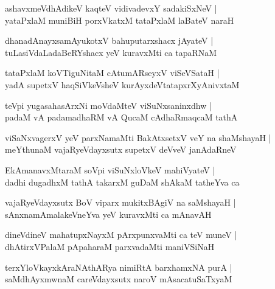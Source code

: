 \documentclass[twoside,12pt,openright]{book}
\newcounter{shloka}[chapter]
\begin{document}
\begin{shloka}%
ashavxmeVdhAdikeV kaqteV vidivadevxY sadakiSxNeV |\\
yataPxlaM muniBiH porxVkatxM tataPxlaM laBateV naraH
\end{shloka}

\begin{shloka}%
dhanadAnayxsamAyukotxV bahuputarxshacx jAyateV |\\
tuLasiVdaLadaBeRYshacx yeV kuravxMti ca tapaRNaM 
\end{shloka}

\begin{shloka}%
tataPxlaM koVTiguNitaM cAtumARseyxV viSeVSataH |\\
yadA supetxV haqSiVkeVsheV kurAyxdeVtatapxrXyAnivxtaM
\end{shloka}

\begin{shloka}%
teVpi yugasahasArxNi moVdaMteV viSuNxsaninxdhw |\\
padaM vA padamadhaRM vA QucaM cAdhaRmaqcaM tathA 
\end{shloka}

\begin{shloka}%
viSaNxvagerxV yeV parxNamaMti BakAtxsetxV veY na shaMshayaH |\\
meYthunaM vajaRyeVdayxsutx supetxV deVveV janAdaRneV 
\end{shloka}

\begin{shloka}%
EkAmanavxMtaraM soVpi viSuNxloVkeV mahiVyateV |\\
dadhi dugadhxM tathA takarxM guDaM shAkaM tatheYva ca 
\end{shloka}

\begin{shloka}%
vajaRyeVdayxsutx BoV viparx mukitxBAgiV na saMshayaH |\\
sAnxnamAmalakeVneYva yeV kuravxMti ca mAnavAH 
\end{shloka}

\begin{shloka}%
dineVdineV mahatupxNayxM pArxpunxvaMti ca teV muneV |\\
dhAtirxVPalaM pApaharaM parxvadaMti maniVSiNaH 
\end{shloka}

\begin{shloka}%
terxYloVkayxkAraNAthARya nimiRtA barxhamxNA purA |\\
saMdhAyxmwnaM careVdayxsutx naroV mAsacatuSaTxyaM 
\end{shloka}
\end{document}

